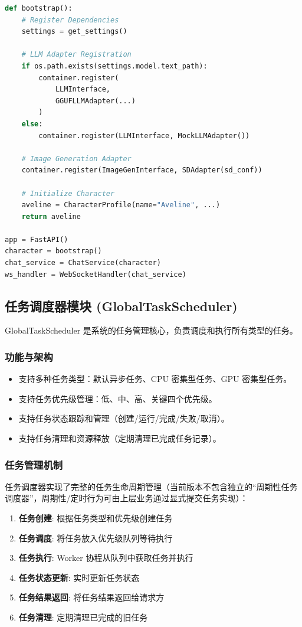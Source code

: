 \documentclass[a4paper,12pt]{article}
\begin{document}
\begin{lstlisting}[language=Python, caption=依赖注入与服务启动 (main.py)]
def bootstrap():
    # Register Dependencies
    settings = get_settings()
    
    # LLM Adapter Registration
    if os.path.exists(settings.model.text_path):
        container.register(
            LLMInterface,
            GGUFLLMAdapter(...)
        )
    else:
        container.register(LLMInterface, MockLLMAdapter())

    # Image Generation Adapter
    container.register(ImageGenInterface, SDAdapter(sd_conf))
    
    # Initialize Character
    aveline = CharacterProfile(name="Aveline", ...)
    return aveline

app = FastAPI()
character = bootstrap()
chat_service = ChatService(character)
ws_handler = WebSocketHandler(chat_service)
\end{lstlisting}

\subsection{任务调度器模块 (GlobalTaskScheduler)}

GlobalTaskScheduler 是系统的任务管理核心，负责调度和执行所有类型的任务。

\subsubsection{功能与架构}
\begin{itemize}
    \item 支持多种任务类型：默认异步任务、CPU 密集型任务、GPU 密集型任务。
    \item 支持任务优先级管理：低、中、高、关键四个优先级。
    \item 支持任务状态跟踪和管理（创建/运行/完成/失败/取消）。
    \item 支持任务清理和资源释放（定期清理已完成任务记录）。
\end{itemize}

\subsubsection{任务管理机制}

任务调度器实现了完整的任务生命周期管理（当前版本不包含独立的“周期性任务调度器”，周期性/定时行为可由上层业务通过显式提交任务实现）：

\begin{enumerate}
    \item \textbf{任务创建}: 根据任务类型和优先级创建任务
    \item \textbf{任务调度}: 将任务放入优先级队列等待执行
    \item \textbf{任务执行}: Worker 协程从队列中获取任务并执行
    \item \textbf{任务状态更新}: 实时更新任务状态
    \item \textbf{任务结果返回}: 将任务结果返回给请求方
    \item \textbf{任务清理}: 定期清理已完成的旧任务
\end{enumerate}
\end{document}
